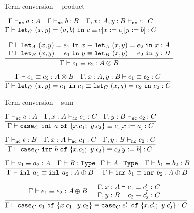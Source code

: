 \begin{frame}{Term conversion -- product}

\begin{center}
  $\infrule{\typing[\Gamma][\noncomputable]{a}{A} \quad \typing[\Gamma][\noncomputable]{b}{B} \quad \typing[\extend{\extend{\Gamma}{x}{A}}{y}{B}][\noncomputable]{c}{C}}{\termconv{\letpair{x}{y}{\pair{a}{b}}{c}[C]}{\subst{\subst{c}{x}{a}}{y}{b}}{C}}$

  \vspace{2em}

  $\infrule{\begin{array}{l} \termconv{\letpair{x}{y}{e_1}{x}[A]}{\letpair{x}{y}{e_2}{x}[A]}{A} \\ \termconv{\letpair{x}{y}{e_1}{y}[B]}{\letpair{x}{y}{e_2}{y}[B]}{B} \end{array}}{\termconv{e_1}{e_2}{\Prod{A}{B}}}$

  \vspace{2em}

  $\infrule{\termconv{e_1}{e_2}{\Prod{A}{B}} \quad \termconv[\extend{\extend{\Gamma}{x}{A}}{y}{B}]{c_1}{c_2}{C}}{\termconv{\letpair{x}{y}{e_1}{c_1}[C]}{\letpair{x}{y}{e_2}{c_2}[C]}{C}}$

\end{center}

\end{frame}

\begin{frame}{Term conversion -- sum}

\begin{center}
  $\infrule{\typing[\Gamma][\noncomputable]{a}{A} \quad \typing[\extend{\Gamma}{x}{A}][\noncomputable]{c_1}{C} \quad \typing[\extend{\Gamma}{y}{B}][\noncomputable]{c_2}{C}}{\termconv{\newcase{\inl{a}}{x}{c_1}{y}{c_2}[C]}{\subst{c_1}{x}{a}}{C}}$

  \vspace{2em}

  $\infrule{\typing[\Gamma][\noncomputable]{b}{B} \quad \typing[\extend{\Gamma}{x}{A}][\noncomputable]{c_1}{C} \quad \typing[\extend{\Gamma}{y}{B}][\noncomputable]{c_2}{C}}{\termconv{\newcase{\inr{b}}{x}{c_1}{y}{c_2}[C]}{\subst{c_2}{y}{b}}{C}}$

  \vspace{2em}

  $\infrule{\termconv{a_1}{a_2}{A} \quad \type{B}}{\termconv{\inl{a_1}}{\inl{a_2}}{\Sum{A}{B}}}$ \quad
  $\infrule{\type{A} \quad \termconv{b_1}{b_2}{B}}{\termconv{\inr{b_1}}{\inr{b_2}}{\Sum{A}{B}}}$

  \vspace{2em}

  $\infrule{\termconv{e_1}{e_2}{\Sum{A}{B}} \quad \begin{array}{l} \termconv[\extend{\Gamma}{x}{A}]{c_1}{c_1'}{C} \\ \termconv[\extend{\Gamma}{y}{B}]{c_2}{c_2'}{C} \end{array}}{\termconv{\newcase{e_1}{x}{c_1}{y}{c_2}[C]}{\newcase{e_1'}{x}{c_1'}{y}{c_2'}[C]}{C}}$
\end{center}

\end{frame}

